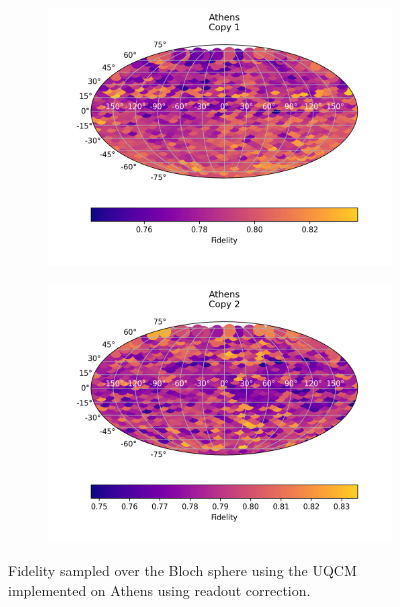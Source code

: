\begin{figure}[H]
    \centering
    \begin{subfigure}{.5\textwidth}
      \centering
      \includegraphics[width=\textwidth]{Figures/UQCM/IBM/FullSphere/results_corrected_athens_copy1.png}
    \end{subfigure}%
    \begin{subfigure}{.5\textwidth}
      \centering
      \includegraphics[width=\textwidth]{Figures/UQCM/IBM/FullSphere/results_corrected_athens_copy2.png}
    \end{subfigure}
    \caption{Fidelity sampled over the Bloch sphere using the UQCM implemented on Athens using readout correction.}
    \label{fig:uqcm_athens}
\end{figure}


